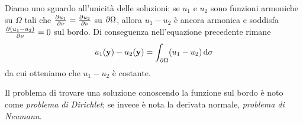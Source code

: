Diamo uno sguardo all'unicità delle soluzioni: se $u_1$ e $u_2$ sono funzioni armoniche su $\Omega$ tali che $\frac{\partial {u_1}}{\partial {\nu}}=\frac{\partial {u_2}}{\partial {\nu}}$ su $\partial\Omega$, allora $u_1-u_2$ è ancora armonica e soddisfa $\frac{\partial {(u_1-u_2)}}{\partial {\nu}}=0$ sul bordo.
Di conseguenza nell'equazione precedente rimane
\begin{equation}
    u_1(\mathbf{y})-u_2(\mathbf{y})=\int_{\partial\Omega}(u_1-u_2)\,\textup{d}\sigma
\end{equation}
da cui otteniamo che $u_1-u_2$ è costante.

Il problema di trovare una soluzione conoscendo la funzione sul bordo è noto come \emph{problema di Dirichlet}; se invece è nota la derivata normale, \emph{problema di Neumann}.
